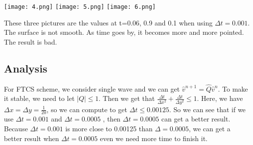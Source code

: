 \documentclass[UTF8]{article}
\begin{document}
\texttt{[image: 4.png]}
\texttt{[image: 5.png]}
\texttt{[image: 6.png]}

These three pictures are the values at t=0.06, 0.9 and 0.1 when using $\Delta t =0.001$. The surface is not smooth. As time goes by, it becomes more and more pointed. The result is bad.

\subsection{Analysis}
For FTCS scheme, we consider single wave and we can get $\hat{v}^{n+1} = \hat{Q} \hat{v}^n$. To make it stable, we need to let $|Q| \leq 1$. Then we get that $\frac{\Delta t}{\Delta x^2} + \frac{\Delta t}{\Delta y^2} \leq 1$. Here, we have $\Delta x = \Delta y = \frac{1}{20}$, so we can compute to get $\Delta t \leq 0.00125$. So we can see that if we use $\Delta t = 0.001$ and $\Delta t = 0.0005$ , then $\Delta t = 0.0005$ can get a better result. Because $\Delta t = 0.001$ is more close to 0.00125 than $\Delta = 0.0005$, we can get a better result when $\Delta t = 0.0005$ even we need more time to finish it.
\end{document}
